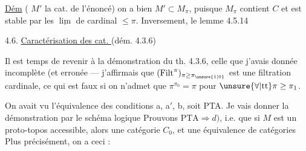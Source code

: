 \uline{Dém} ( $M'$ la cat. de l'énoncé) on a bien $M'\subset M_\pi$, puisque $M_\pi$ contient $C$ et est stable par les $\underline{\lim}$ de cardinal $\leq\pi$. Inversement, le lemme 4.5.14

4.6. \uline{Caractérisation des cat. } (dém.  4.3.6)

 Il est temps de revenir à la démonstration du th. 4.3.6,  celle que j'avais donnée  incomplète (et erronée --- j'affirmais que $(\mathrm{Filt}^\pi)_{\pi\geq\pi_{\unsure{1|0}}}$ est une filtration cardinale, ce qui est faux si on n'admet que $\pi^{\pi_0}=\pi$ pour $\unsure{\forall|\mathrm{tt}}\pi\geq\pi_1$.

On avait vu l'équivalence des conditions a, a$'$, b, soit PTA. Je vais donner la démonstration par le schéma logique
Prouvons $\mathrm{PTA}\Rightarrow d)$, i.e. que si $M$ est un proto-topos accessible, alors    une   catégorie $C_0$,   et une équivalence de catégories
Plus précisément, on a ceci :

